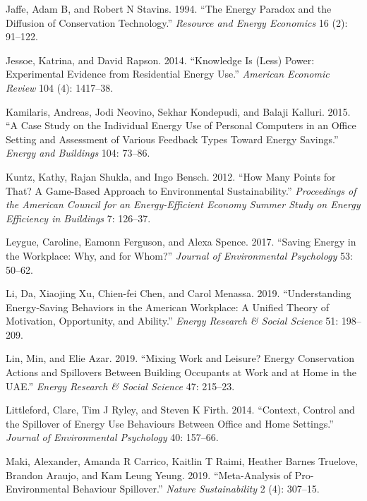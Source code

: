\documentclass[
  11pt,
  captions=heading]{scrreport}
\newlength{\cslhangindent}
\newlength{\cslentryspacingunit} %
\newenvironment{CSLReferences}[2] %
 {%
  \setlength{\parindent}{0pt}
  \ifodd #1
  \let\oldpar\par
  \def\par{\hangindent=\cslhangindent\oldpar}
  \fi
  \setlength{\parskip}{#2\cslentryspacingunit}
 }%
 {}
\begin{document}
\begin{CSLReferences}{1}{0}
\leavevmode{}%
Jaffe, Adam B, and Robert N Stavins. 1994. {``The Energy Paradox and the
Diffusion of Conservation Technology.''} \emph{Resource and Energy
Economics} 16 (2): 91--122.

\leavevmode{}%
Jessoe, Katrina, and David Rapson. 2014. {``Knowledge Is (Less) Power:
Experimental Evidence from Residential Energy Use.''} \emph{American
Economic Review} 104 (4): 1417--38.

\leavevmode{}%
Kamilaris, Andreas, Jodi Neovino, Sekhar Kondepudi, and Balaji Kalluri.
2015. {``A Case Study on the Individual Energy Use of Personal Computers
in an Office Setting and Assessment of Various Feedback Types Toward
Energy Savings.''} \emph{Energy and Buildings} 104: 73--86.

\leavevmode{}%
Kuntz, Kathy, Rajan Shukla, and Ingo Bensch. 2012. {``How Many Points
for That? A Game-Based Approach to Environmental Sustainability.''}
\emph{Proceedings of the American Council for an Energy-Efficient
Economy Summer Study on Energy Efficiency in Buildings} 7: 126--37.

\leavevmode{}%
Leygue, Caroline, Eamonn Ferguson, and Alexa Spence. 2017. {``Saving
Energy in the Workplace: Why, and for Whom?''} \emph{Journal of
Environmental Psychology} 53: 50--62.

\leavevmode{}%
Li, Da, Xiaojing Xu, Chien-fei Chen, and Carol Menassa. 2019.
{``Understanding Energy-Saving Behaviors in the American Workplace: A
Unified Theory of Motivation, Opportunity, and Ability.''} \emph{Energy
Research \& Social Science} 51: 198--209.

\leavevmode{}%
Lin, Min, and Elie Azar. 2019. {``Mixing Work and Leisure? Energy
Conservation Actions and Spillovers Between Building Occupants at Work
and at Home in the UAE.''} \emph{Energy Research \& Social Science} 47:
215--23.

\leavevmode{}%
Littleford, Clare, Tim J Ryley, and Steven K Firth. 2014. {``Context,
Control and the Spillover of Energy Use Behaviours Between Office and
Home Settings.''} \emph{Journal of Environmental Psychology} 40:
157--66.

\leavevmode{}%
Maki, Alexander, Amanda R Carrico, Kaitlin T Raimi, Heather Barnes
Truelove, Brandon Araujo, and Kam Leung Yeung. 2019. {``Meta-Analysis of
Pro-Environmental Behaviour Spillover.''} \emph{Nature Sustainability} 2
(4): 307--15.


\end{CSLReferences}
\end{document}
